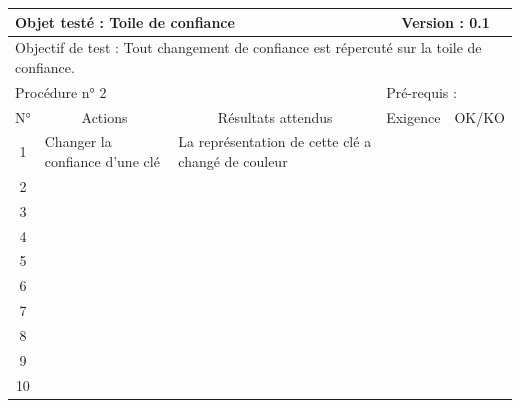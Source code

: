 \documentclass{../res/univ-projet}
\begin{document}
\begin{center}
    \begin{tabular}{|c|p{5cm}|p{5cm}|p{1.5cm}|p{1.5cm}|}
      \hline
      \multicolumn{3}{|l|}{Objet testé : Toile de confiance} & \multicolumn{2}{c|}{Version : 0.1}\\ \hline
      \multicolumn{5}{|l|}{Objectif de test : Tout changement de confiance est répercuté sur la toile de confiance.}\\ \hline
      \multicolumn{3}{|l|}{Procédure n° 2} & \multicolumn{2}{p{3cm}|}{Pré-requis : }\\ \hline
      \multicolumn{1}{|c|}{N°} & \multicolumn{1}{c|}{Actions} & \multicolumn{1}{c|}{Résultats attendus} & 
      \multicolumn{1}{c|}{Exigence} & \multicolumn{1}{c|}{OK/KO}\\ \hline
      1 & Changer la confiance d'une clé & La représentation de cette clé a changé de couleur &  & \\
      2 &  &  &  & \\
      3 &  &  &  & \\ 
	  4 &  &  &  & \\
      5 &  &  &  & \\
	  6 &  &  &  & \\
      7 &  &  &  & \\
      8 &  &  &  & \\
      9 &  &  &  & \\
      10 &  &  &  &\\ 
	\hline
    \end{tabular}
    \vskip 2.2cm




\end{center}
\end{document}
